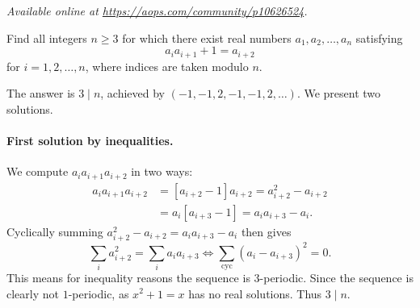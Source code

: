\textsl{Available online at \url{https://aops.com/community/p10626524}.}
\begin{mdframed}[style=mdpurplebox,frametitle={Problem statement}]
Find all integers $n \geq 3$ for which
there exist real numbers $a_1, a_2, \dots, a_n$ satisfying
\[ a_i a_{i+1} +1 = a_{i+2} \]
for $i=1,2, \dots, n$, where indices are taken modulo $n$.
\end{mdframed}
The answer is $3 \mid n$,
achieved by $(-1,-1,2,-1,-1,2,\dots)$.
We present two solutions.

\paragraph{First solution by inequalities.}
We compute $a_i a_{i+1} a_{i+2}$ in two ways:
\begin{align*}
  a_i a_{i+1} a_{i+2} &= [a_{i+2}-1]a_{i+2} = a_{i+2}^2 - a_{i+2} \\
  &= a_i [a_{i+3}-1] = a_i a_{i+3} - a_i.
\end{align*}
Cyclically summing $a_{i+2}^2 - a_{i+2} = a_i a_{i+3} - a_i$ then gives
\[ \sum_i a_{i+2}^2 = \sum_i a_i a_{i+3}
  \iff \sum_{\text{cyc}} \left( a_i - a_{i+3} \right)^2 = 0.  \]
This means for inequality reasons the sequence is $3$-periodic.
Since the sequence is clearly not $1$-periodic,
as $x^2 + 1 = x$ has no real solutions.
Thus $3 \mid n$.

